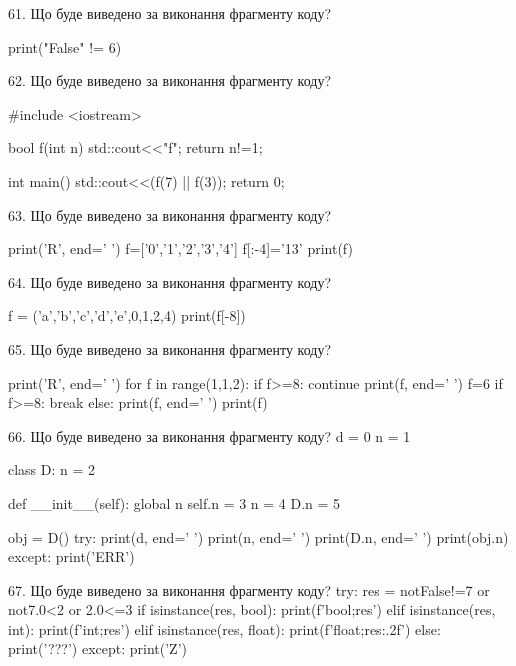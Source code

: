 \documentclass[11pt]{article}
\begin{document}
\vspace{5mm}

61. Що буде виведено за виконання фрагменту коду?

print("False" != 6)
\vspace{5mm}

62. Що буде виведено за виконання фрагменту коду?

#include <iostream>

bool f(int n){
    std::cout<<"f";
    return n!=1;
}

int main(){
    std::cout<<(f(7) || f(3));
    return 0;
}
\vspace{5mm}

63. Що буде виведено за виконання фрагменту коду?

print('R', end=' ')
f=['0','1','2','3','4']
f[:-4]='13'
print(f)

\vspace{5mm}

64. Що буде виведено за виконання фрагменту коду?

f = ('a','b','c','d','e',0,1,2,4)
print(f[-8])

\vspace{5mm}

65. Що буде виведено за виконання фрагменту коду?

print('R', end=' ')
for f in range(1,1,2):
    if f>=8:
        continue
        print(f, end=' ')
        f=6
    if f>=8:
        break
    else:
        print(f, end=' ')
    print(f)
\vspace{5mm}

66. Що буде виведено за виконання фрагменту коду?
d = 0
n = 1

class D:
    n = 2
    
    def __init__(self):
global n        self.n = 3
        n = 4
        D.n = 5

obj = D()
try:
    print(d, end=' ')
    print(n, end=' ')
    print(D.n, end=' ')
    print(obj.n)
except:
    print('ERR')
\vspace{5mm}

67. Що буде виведено за виконання фрагменту коду?
try:
    res = notFalse!=7 or not7.0<2 or 2.0<=3
    if isinstance(res, bool):
        print(f'bool;{res}')
    elif isinstance(res, int):
        print(f'int;{res}')
    elif isinstance(res, float):
        print(f'float;{res:.2f}')
    else:
        print('???')
except:
    print('Z')
\vspace{5mm}
\end{document}
